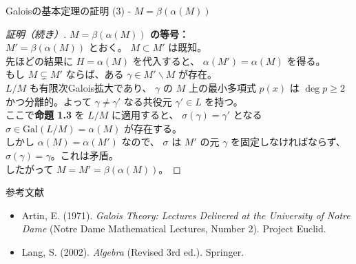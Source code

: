 \documentclass[aspectratio=169,11pt,unicode]{beamer}
\begin{document}
\begin{frame}{Galoisの基本定理の証明 (3) - $M = \beta(\alpha(M))$}
\begin{proof}[証明（続き）]
\textbf{$M = \beta(\alpha(M))$ の等号：}\\
$M' = \beta(\alpha(M))$ とおく。 $M \subset M'$ は既知。\\
先ほどの結果に $H = \alpha(M)$ を代入すると、 $\alpha(M') = \alpha(M)$ を得る。\\
もし $M \subsetneq M'$ ならば、ある $\gamma \in M' \smallsetminus M$ が存在。\\
$L/M$ も有限次Galois拡大であり、 $\gamma$ の $M$ 上の最小多項式 $p(x)$ は $\deg p \ge 2$ かつ分離的。よって $\gamma \neq \gamma'$ なる共役元 $\gamma' \in L$ を持つ。\\
ここで\textbf{命題 1.3} を $L/M$ に適用すると、 $\sigma(\gamma) = \gamma'$ となる $\sigma \in \mathrm{Gal}(L/M) = \alpha(M)$ が存在する。\\
しかし $\alpha(M) = \alpha(M')$ なので、 $\sigma$ は $M'$ の元 $\gamma$ を固定しなければならず、 $\sigma(\gamma) = \gamma$。これは矛盾。\\
したがって $M = M' = \beta(\alpha(M))$。
\end{proof}
\end{frame}

\begin{frame}{参考文献}
\begin{itemize}
    \item Artin, E. (1971). \textit{Galois Theory: Lectures Delivered at the University of Notre Dame} (Notre Dame Mathematical Lectures, Number 2). Project Euclid.
    \item Lang, S. (2002). \textit{Algebra} (Revised 3rd ed.). Springer.
\end{itemize}
\end{frame}
\end{document}
